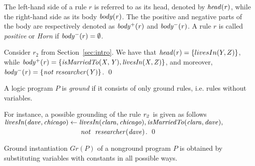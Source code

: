 The left-hand side of a rule $r$ is referred to as its head, denoted by $\mathit{head(r)}$, while the right-hand side as its body $\mathit{body(r)}$. The the positive and negative parts of the body are respectively denoted as $\mathit{body^+(r)}$ and $\mathit{body^-(r)}$. A rule $r$ is called \emph{positive} or
\emph{Horn} if $\mathit{body^-}(r)=\emptyset$.

\begin{example}
Consider $r_2$ from Section~\ref{sec:intro}. We have that $\mathit{head(r)}=\{livesIn(Y,Z)\}$, while $\mathit{body^+(r)=\{isMarriedTo(X,Y), livesIn(X,Z)\}}$, and moreover,\\ $\mathit{body^-(r)=\{not\;researcher(Y)\}}$. \qed
\end{example}


 


  
  



A logic program $P$ is \emph{ground} if it consists of only ground rules, i.e. rules without
variables. 

\begin{example}
For instance, a possible grounding of the rule $\mathit{r_2}$ is given as follows $\mathit{livesIn(dave,chicago)\leftarrow livesIn(clara,chicago),isMarriedTo(clara,dave),}$\\$
\phantom{livesIn(dave,chicago)\leftarrow}\mathit{not}~ \mathit{\;researcher(dave)}$. \qed
\end{example}

Ground instantiation $Gr(P)$ of a nonground program $P$ is obtained by substituting variables with constants in all possible ways. 


